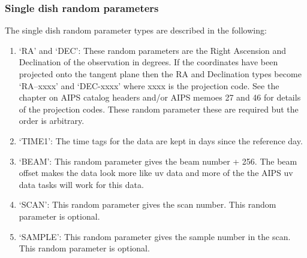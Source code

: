\subsubsection{Single dish random parameters }
The single dish random parameter types are described in the following:
\begin{enumerate} %
\item `RA' and `DEC':  These random parameters are the Right
Ascension and Declination of the observation in degrees.  If the
coordinates have been projected onto the tangent plane then the RA and
Declination types become `RA--xxxx' and `DEC-xxxx' where xxxx is the
projection code.  See the chapter on AIPS catalog headers and/or
AIPS memoes 27 and 46 for details of the projection codes.  These
random parameter these are required but the order is arbitrary.
\item `TIME1': The time tags for the data are kept in days since the
reference day.
\item `BEAM': This random parameter gives the beam number + 256.
The beam offset makes the data look more like
uv data and more of the the AIPS uv data tasks will work for this data.
\item `SCAN': This random parameter gives the scan number. This random
parameter is optional.
\item `SAMPLE': This random parameter gives the sample number in the scan.
This random parameter is optional.

\end{enumerate} %

